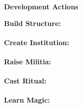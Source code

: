 \documentclass[12pt]{extarticle}
\begin{document}
    \newpage
    \begin{center}\huge \textbf{Development Actions} \end{center}
    \large \textbf{Build Structure:}
    \small\paragraph{}\par
    \bigskip
    \noindent\large \textbf{Create Institution:}
    \small\paragraph{}\par
    \bigskip
    \noindent\large \textbf{Raise Militia:}
    \small\paragraph{}\par
    \bigskip
    \noindent\large \textbf{Cast Ritual:}
    \small\paragraph{}\par
    \bigskip
    \noindent\large \textbf{Learn Magic:}
    \small\paragraph{}\par
    \bigskip
\end{document}
